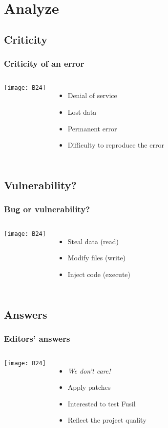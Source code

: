 \section{Analyze}

\subsection{Criticity}
\frame
{
    \frametitle{Criticity of an error}
    \begin{columns}[c]
        \column{2.3in}
            \texttt{[image: B24]}

        \column{2.4in}
          \begin{itemize}
          \item Denial of service
          \item Lost data
          \item Permanent error
          \item Difficulty to reproduce the error
          \end{itemize}
    \end{columns}
}


\subsection{Vulnerability?}
\frame
{
    \frametitle{Bug or vulnerability?}

    \begin{columns}[c]
        \column{2.3in}
            \texttt{[image: B24]}

        \column{2.4in}
            \begin{itemize}
            \item Steal data (read)
            \item Modify files (write)
            \item Inject code (execute)
            \end{itemize}
    \end{columns}
}

\subsection{Answers}
\frame
{
    \frametitle{Editors' answers}

    \begin{columns}[c]
        \column{2.3in}
            \texttt{[image: B24]}

        \column{2.4in}
            \begin{itemize}
            \item \textit{We don't care!}
            \item Apply patches
            \item Interested to test Fusil
            \item Reflect the project quality
            \end{itemize}
    \end{columns}
}

